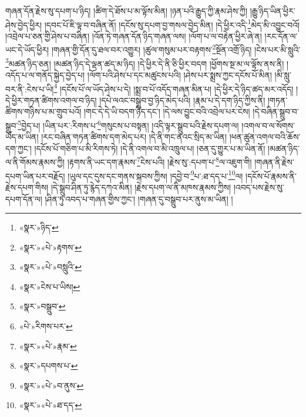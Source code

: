 གཞན་དོན་རྗེས་སུ་དཔག་པ་ཉིད། །ཚིག་དེ་ཐོས་པ་མ་ལྟོས་མིན། །ཉན་པའི་རྒྱུད་ཀྱི་རྣམ་ཤེས་ཀྱི། །རྒྱུ་ཉིད་ཡིན་ཕྱིར་ཤེས་བྱེད་ཕྱིར། །དབང་པོ་ཇི་ལྟ་བ་བཞིན་ནོ། །དངོས་སུ་དཔག་བྱ་གསལ་བྱེད་མིན། །དེ་ཕྱིར་འདི་\footnote{«སྣར་»ཉིད་}མེད་མི་འབྱུང་བའོ། །འབྲེལ་པ་ཅན་གྱི་ཤེས་པ་བཞིན། །འོན་ཏེ་གཞན་དོན་ཉིད་གཞན་ལས། །ལོག་པ་ལ་བརྟེན་ཕྱིར་ཞེ་ན། །རང་དོན་ལ་ཡང་དེ་ཡོད་ཕྱིར། །གཞན་གྱི་དོན་དུ་ཐལ་བར་འགྱུར། །ཚུལ་གསུམ་པར་བརྟགས་\footnote{«སྣར་»«པེ་»རྟགས་}སྔོན་འགྲོ་ཉིད། །ངེས་པར་མི་སླུའི་\footnote{«སྣར་»«པེ་»བསླུའི་}མཚན་ཉིད་ཅན། །མཚན་ཉིད་དེ་ལྡན་ཚད་མ་ཉིད། །དེ་ཕྱིར་དེ་ནི་ཅི་ཕྱིར་བདག །ཕྱོགས་སྔ་མ་ལ་ལྟོས་ནས་ནི། །འདོད་པ་ལ་གནོད་སྐྱེད་བྱེད་པ། །ལོག་པའི་ཤེས་པ་དང་མཚུངས་པའི། །ཤེས་པར་སྨྲས་ཀྱང་དངོས་པོ་མིན། །མི་སླུ་བར་ནི་:ངེས་པ་ཡི།\footnote{«སྣར་»ངེས་པ་ཡིས།} །དངོས་པོ་ལ་ཡོད་ཤེས་པ་དེ། །སྨྲ་བ་པོ་འདོད་གཞན་མིན་པ། །དེ་ཕྱིར་དེ་ཉིད་ཚད་མར་འདོད། །དེ་ཕྱིར་གཏན་ཚིགས་འགལ་བ་ཉིད། །དཔེ་ལའང་བསྒྲུབ་བྱ་ཉིད་མེད་པའི། །རྣམ་པ་དེ་དག་ཉིད་ཀྱིས་ནི། །གཏན་ཚིགས་གཉིས་པ་མ་གྲུབ་པའོ། །གང་དེ་དེ་ཡི་བདག་ཉིད་དང་། །དེ་ལས་བྱུང་བའི་འབྲེལ་པར་ངེས། །དེ་བཞིན་སྒྲུབ་བ་སྒྲུབ་\footnote{«སྣར་»བསྒྲུབ་}བྱེད་པ། །ཡིན་པར་:རིགས་པ་\footnote{«པེ་»རིགས་པར་}གསུངས་པ་བསྟན། །འདི་ལྟར་སྒྲུབ་པའི་རྗེས་དཔག་ལ། །འགལ་བ་ལ་སོགས་ཡོད་མ་ཡིན། །རང་བཞིན་གཏན་ཚིགས་དག་མེད་པར། །དེ་ནི་གང་ནའང་སྲིད་མ་ཡིན། །ཕན་ཚུན་འགལ་བའི་ཆོས་དག་ཀྱང་། །དངོས་པོ་གཅིག་པ་མི་རིགས་ཏེ། །དེ་ནི་འགལ་བ་མི་འཁྲུལ་པ། །ཅན་དུ་གྱུར་པ་མ་ཡིན་ནོ། །མཚན་ཉིད་ལ་ནི་གོམས་རྣམས་ཀྱི། །རྟགས་ནི་ཡང་དག་རྣམས་\footnote{«སྣར་»«པེ་»རྣམ་}ངེས་པའི། །རྗེས་སུ་:དཔག་པ་\footnote{«སྣར་»དཔགས་པ་}ལ་འཇུག་གི། །གཞན་ནི་རྗེས་དཔག་ཡིན་པར་བརྗོད། །ཡུལ་དང་དུས་དང་གནས་སྐབས་ཀྱིས། །དབྱེ་བ་\footnote{«སྣར་»«པེ་»བ་ནུས་}པ་:ཐ་དད་པ་\footnote{«སྣར་»«པེ་»ཐ་དད་}ལ། །དངོས་པོ་རྣམས་ནི་རྗེས་དཔག་གིས། །དེ་སྒྲུབ་ཤིན་ཏུ་རྙེད་དཀའ་མིན། །རྗེས་དཔག་ལ་ནི་མཁས་རྣམས་ཀྱིས། །འབད་པས་རྗེས་སུ་དཔག་དོན་ལ། །ཤིན་ཏུ་འབད་པ་གཞན་གྱིས་ཀྱང་། །གཞན་དུ་བསྒྲུབ་པར་ནུས་མ་ཡིན། །
